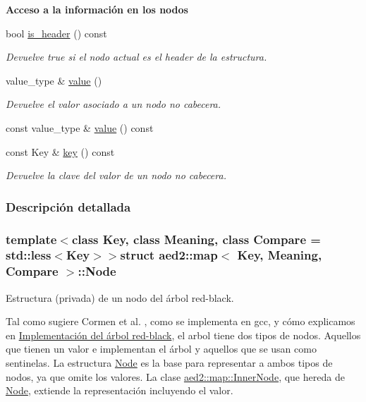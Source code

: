 \begin{Indent}{\bf \-Acceso a la información en los nodos}\par
\begin{DoxyCompactItemize}
\item 
bool \hyperlink{structaed2_1_1map_1_1Node_ae6cc4598a60dbab7120ffae58ebbadca_ae6cc4598a60dbab7120ffae58ebbadca}{is\-\_\-header} () const 
\begin{DoxyCompactList}\small\item\em \-Devuelve true si el nodo actual es el header de la estructura. \end{DoxyCompactList}\item 
value\-\_\-type \& \hyperlink{structaed2_1_1map_1_1Node_af4ada8e79dabb4849fc87de63d3970fb_af4ada8e79dabb4849fc87de63d3970fb}{value} ()
\begin{DoxyCompactList}\small\item\em \-Devuelve el valor asociado a un nodo no cabecera. \end{DoxyCompactList}\item 
const value\-\_\-type \& \hyperlink{structaed2_1_1map_1_1Node_a747a33f40ad748d750372fe73aea0b32_a747a33f40ad748d750372fe73aea0b32}{value} () const 
\item 
const \-Key \& \hyperlink{structaed2_1_1map_1_1Node_a5451f8da0b7ad3582fab1decad5d09cb_a5451f8da0b7ad3582fab1decad5d09cb}{key} () const 
\begin{DoxyCompactList}\small\item\em \-Devuelve la clave del valor de un nodo no cabecera. \end{DoxyCompactList}\end{DoxyCompactItemize}
\end{Indent}


\subsubsection{\-Descripción detallada}
\subsubsection*{template$<$class \-Key, class \-Meaning, class \-Compare = std\-::less$<$\-Key$>$$>$struct aed2\-::map$<$ Key, Meaning, Compare $>$\-::\-Node}

\-Estructura (privada) de un nodo del árbol red-\/black. 

\-Tal como sugiere \-Cormen et al. \cite{CormenLeisersonRivestStein2009}, como se implementa en gcc, y cómo explicamos en \hyperlink{Implementacion}{\-Implementación del árbol red-\/black}, el arbol tiene dos tipos de nodos. \-Aquellos que tienen un valor e implementan el árbol y aquellos que se usan como sentinelas. \-La estructura \hyperlink{structaed2_1_1map_1_1Node}{\-Node} es la base para representar a ambos tipos de nodos, ya que omite los valores. \-La clase \hyperlink{structaed2_1_1map_1_1InnerNode}{aed2\-::map\-::\-Inner\-Node}, que hereda de \hyperlink{structaed2_1_1map_1_1Node}{\-Node}, extiende la representación incluyendo el valor.

